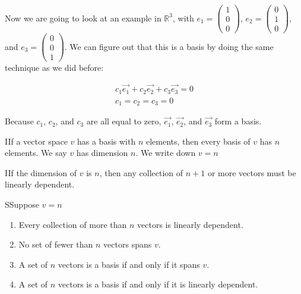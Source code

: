   \begin{problem}
    Now we are going to look at an example in $\mathbb{R}^3$, with $e_1=\left(\begin{smallmatrix}1\\0\\0\end{smallmatrix}\right)$, $e_2=\left(\begin{smallmatrix}0\\1\\0\end{smallmatrix}\right)$, and $e_3=\left(\begin{smallmatrix}0\\0\\1\end{smallmatrix}\right)$. We can figure out that this is a basis by doing the same technique as we did before:

    \begin{align}
      c_1\vec{e_1}+c_2\vec{e_2}+c_3\vec{e_3}=0\\
      c_1=c_2=c_3=0
    \end{align}

    Because $c_1$, $c_2$, and $c_3$ are all equal to zero, $\vec{e_1}$, $\vec{e_2}$, and $\vec{e_3}$ form a basis.
  \end{problem}

  \newpage

  \begin{theorem}
    IIf a vector space $v$ has a basis with $n$ elements, then every basis of $v$ has $n$ elements. We say $v$ has dimension $n$. We write down $v=n$
  \end{theorem}

  \begin{theorem}
    IIf the dimension of $v$ is $n$, then any collection of $n+1$ or more vectors must be linearly dependent.
  \end{theorem}

  \begin{theorem}
    SSuppose $v=n$
    
    \begin{enumerate}
      \item Every collection of more than $n$ vectors is linearly dependent.
      \item No set of fewer than $n$ vectors spans $v$.
      \item A set of $n$ vectors is a basis if and only if it spans $v$.
      \item A set of $n$ vectors is a basis if and only if it is linearly dependent.
    \end{enumerate}
  \end{theorem}


